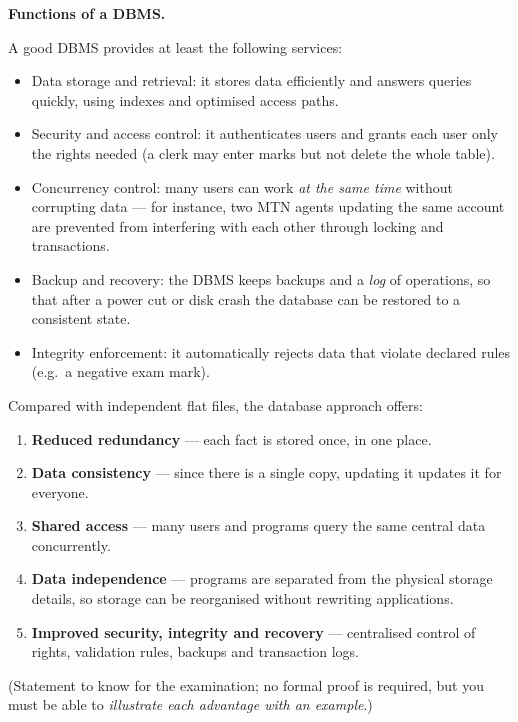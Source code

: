 \documentclass[11pt]{article}
\newcommand{\cle}[1]{{\popxbold\color{popdark}#1}}
\begin{document}
\textbf{Functions of a DBMS.}\par
A good DBMS provides at least the following services:
\begin{itemize}
\item \cle{Data storage and retrieval}: it stores data efficiently and answers queries quickly, using indexes and optimised access paths.
\item \cle{Security and access control}: it authenticates users and grants each user only the rights needed (a clerk may enter marks but not delete the whole table).
\item \cle{Concurrency control}: many users can work \emph{at the same time} without corrupting data — for instance, two MTN agents updating the same account are prevented from interfering with each other through locking and transactions.
\item \cle{Backup and recovery}: the DBMS keeps backups and a \emph{log} of operations, so that after a power cut or disk crash the database can be restored to a consistent state.
\item \cle{Integrity enforcement}: it automatically rejects data that violate declared rules (e.g.\ a negative exam mark).
\end{itemize}

\begin{propriete}
Compared with independent flat files, the database approach offers:
\begin{enumerate}
\item \textbf{Reduced redundancy} — each fact is stored once, in one place.
\item \textbf{Data consistency} — since there is a single copy, updating it updates it for everyone.
\item \textbf{Shared access} — many users and programs query the same central data concurrently.
\item \textbf{Data independence} — programs are separated from the physical storage details, so storage can be reorganised without rewriting applications.
\item \textbf{Improved security, integrity and recovery} — centralised control of rights, validation rules, backups and transaction logs.
\end{enumerate}
(Statement to know for the examination; no formal proof is required, but you must be able to \emph{illustrate each advantage with an example}.)
\end{propriete}
\end{document}
